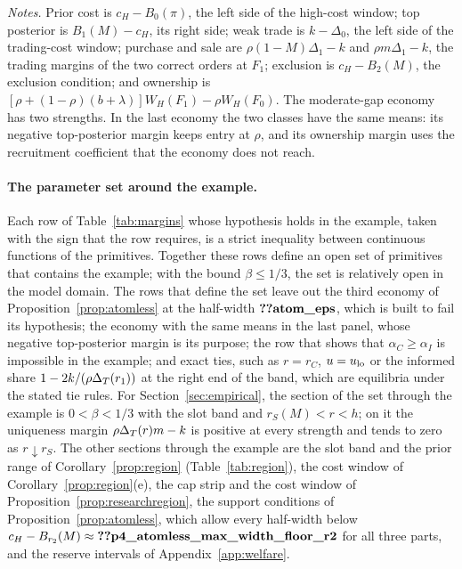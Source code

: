 \begin{table}[ht]
\begin{tabular}{@{}lrrrrrrr@{}}
\bottomrule
\end{tabular}
\par\medskip
\begin{minipage}{0.95\linewidth}\footnotesize
\textit{Notes.} Prior cost is \(c_H-B_0(\pi)\), the left side of the high-cost window; top posterior is
\(B_1(M)-c_H\), its right side; weak trade is \(k-\Delta_0\), the left side of the trading-cost window; purchase and
sale are \(\rho(1-M)\Delta_1-k\) and \(\rho m\Delta_1-k\), the trading margins of the two correct orders at \(F_1\);
exclusion is \(c_H-B_2(M)\), the exclusion condition; and ownership is
\([\rho+(1-\rho)(b+\lambda)]W_H(F_1)-\rho W_H(F_0)\). The moderate-gap economy has two strengths. In the last
economy the two classes have the same means: its negative top-posterior margin keeps entry at \(\rho\), and its
ownership margin uses the recruitment coefficient that the economy does not reach.
\end{minipage}
\end{table}

\paragraph{The parameter set around the example.}
Each row of Table~\ref{tab:margins} whose hypothesis holds in the example, taken with the sign that the row requires,
is a strict inequality between continuous functions of the primitives. Together these rows define an open set of
primitives that contains the example; with the bound \(\beta\le1/3\), the set is relatively open in the model domain.
The rows that define the set leave out the third economy of Proposition~\ref{prop:atomless} at the half-width
\(\reg{atom_eps}\), which is built to fail its hypothesis; the economy with the same means in the last panel, whose
negative top-posterior margin is its purpose; the row that shows that \(\alpha_C\ge\alpha_I\) is impossible in the
example; and exact ties, such as \(r=r_C\), \(u=u_{\rm lo}\) or the informed share \(1-2k/(\rho\Delta_T(r_1))\) at the
right end of the band, which are equilibria under the stated tie rules. For Section~\ref{sec:empirical}, the section
of the set through the example is \(0<\beta<1/3\) with the slot band and \(r_S(M)<r<h\); on it the uniqueness margin
\(\rho\Delta_T(r)m-k\) is positive at every strength and tends to zero as \(r\downarrow r_S\). The other sections through
the example are the slot band and the prior range of Corollary~\ref{prop:region} (Table~\ref{tab:region}), the cost
window of Corollary~\ref{prop:region}(e), the cap strip and the cost window of
Proposition~\ref{prop:researchregion}, the support conditions of Proposition~\ref{prop:atomless}, which allow every
half-width below \(c_H-B_{r_2}(M)\approx\reg{p4_atomless_max_width_floor_r2}\) for all three parts, and the reserve intervals of
Appendix~\ref{app:welfare}.
